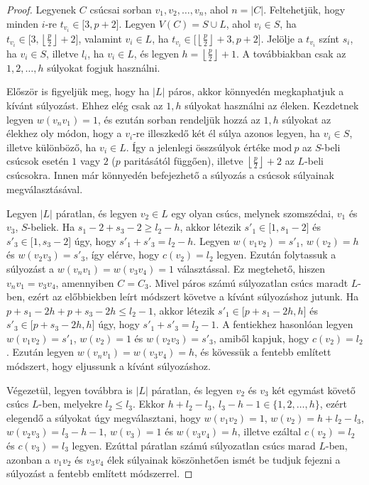 \documentclass[12pt, a4paper]{report}
\theoremstyle{remark}
\theoremstyle{definition}
\begin{document}
\begin{proof}
Legyenek $C$ csúcsai sorban $v_1, v_2, \ldots, v_n$, ahol $n = |C|$. Feltehetjük, hogy minden $i$-re $t_{v_i} \in \lbrack 3, p + 2 \rbrack$. Legyen $V(C) = S \cup L$, ahol $v_i \in S$, ha $t_{v_i} \in \lbrack 3, \left\lfloor \frac{p}{2} \right\rfloor + 2 \rbrack$, valamint $v_i \in L$, ha $t_{v_i} \in \lbrack \left\lfloor \frac{p}{2} \right\rfloor + 3, p + 2 \rbrack$. Jelölje a $t_{v_i}$ színt $s_i$, ha $v_i \in S$, illetve $l_i$, ha $v_i \in L$, és legyen $h = \left\lfloor \frac{p}{2} \right\rfloor + 1$. A továbbiakban csak az $1, 2, \ldots, h$ súlyokat fogjuk használni. 

Először is figyeljük meg, hogy ha $|L|$ páros, akkor könnyedén megkaphatjuk a kívánt súlyozást. Ehhez elég csak az $1, h$ súlyokat használni az éleken. Kezdetnek legyen $w(v_n v_1) = 1$, és ezután sorban rendeljük hozzá az $1, h$ súlyokat az élekhez oly módon, hogy a $v_i$-re illeszkedő két él súlya azonos legyen, ha $v_i \in S$, illetve különböző, ha $v_i \in L$. Így a jelenlegi összsúlyok értéke $\mathrm{mod}\ p$ az $S$-beli csúcsok esetén $1$ vagy $2$ ($p$ paritásától függően), illetve $\left\lfloor \frac{p}{2} \right\rfloor + 2$ az $L$-beli csúcsokra. Innen már könnyedén befejezhető a súlyozás a csúcsok súlyainak megválasztásával.

Legyen $|L|$ páratlan, és legyen $v_2 \in L$ egy olyan csúcs, melynek szomszédai, $v_1$ és $v_3$, $S$-beliek. Ha $s_1 - 2 + s_3 - 2 \geq l_2 - h$, akkor létezik $s'_1 \in \lbrack 1, s_1 - 2 \rbrack$ és $s'_3 \in \lbrack 1, s_3 - 2 \rbrack$ úgy, hogy $s'_1 + s'_3 = l_2 - h$. Legyen $w(v_1 v_2) = s'_1$, $w(v_2) = h$ és $w(v_2 v_3) = s'_3$, így elérve, hogy $c(v_2) = l_2$ legyen. Ezután folytassuk a súlyozást a $w(v_n v_1) = w(v_3 v_4) = 1$ választással. Ez megtehető, hiszen $v_n v_1 = v_3 v_4$, amennyiben $C = C_3$. Mivel páros számú súlyozatlan csúcs maradt $L$-ben, ezért az előbbiekben leírt módszert követve a kívánt súlyozáshoz jutunk. Ha $p + s_1 - 2h + p + s_3 - 2h \leq l_2 - 1$, akkor létezik $s'_1 \in \lbrack p + s_1 - 2h, h \rbrack$ és $s'_3 \in \lbrack p + s_3 - 2h, h \rbrack$ úgy, hogy $s'_1 + s'_3 = l_2 - 1$. A fentiekhez hasonlóan legyen $w(v_1 v_2)= s'_1$, $w(v_2) = 1$ és $w(v_2 v_3) = s'_3$, amiből kapjuk, hogy $c(v_2) = l_2$. Ezután legyen $w(v_n v_1) = w(v_3 v_4) = h$, és kövessük a fentebb említett módszert, hogy eljussunk a kívánt súlyozáshoz.

Végezetül, legyen továbbra is $|L|$ páratlan, és legyen $v_2$ és $v_3$ két egymást követő csúcs $L$-ben, melyekre $l_2 \leq l_3$. Ekkor $h + l_2 - l_3,\ l_3 - h - 1 \in \lbrace 1, 2, \ldots, h \rbrace$, ezért elegendő a súlyokat úgy megválasztani, hogy $w(v_1 v_2) = 1$, $w(v_2) = h + l_2 - l_3$, $w(v_2 v_3) = l_3 - h - 1$, $w(v_3) = 1$ és $w(v_3 v_4) = h$, illetve ezáltal $c(v_2) = l_2$ és $c(v_3) = l_3$ legyen. Ezúttal páratlan számú súlyozatlan csúcs marad $L$-ben, azonban a $v_1 v_2$ és $v_3 v_4$ élek súlyainak köszönhetően ismét be tudjuk fejezni a súlyozást a fentebb említett módszerrel.
\end{proof}
\end{document}
